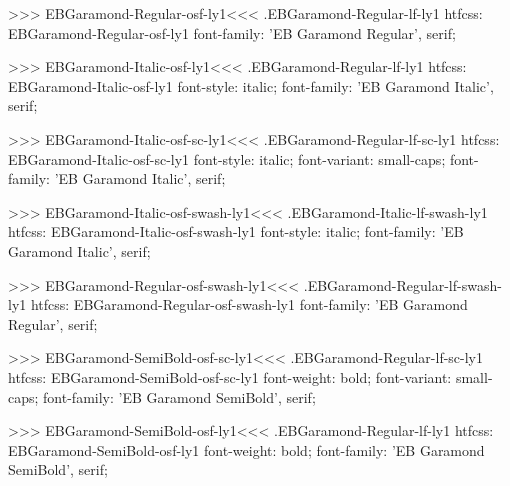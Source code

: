 {{>>>
\<EBGaramond-Regular-osf-ly1\><<<
.EBGaramond-Regular-lf-ly1
htfcss:  EBGaramond-Regular-osf-ly1  font-family: 'EB Garamond Regular', serif;

>>>
\<EBGaramond-Italic-osf-ly1\><<<
.EBGaramond-Regular-lf-ly1
htfcss:  EBGaramond-Italic-osf-ly1  font-style: italic; font-family: 'EB Garamond Italic', serif;

>>>
\<EBGaramond-Italic-osf-sc-ly1\><<<
.EBGaramond-Regular-lf-sc-ly1
htfcss:  EBGaramond-Italic-osf-sc-ly1  font-style: italic; font-variant: small-caps; font-family: 'EB Garamond Italic', serif;

>>>
\<EBGaramond-Italic-osf-swash-ly1\><<<
.EBGaramond-Italic-lf-swash-ly1
htfcss:  EBGaramond-Italic-osf-swash-ly1  font-style: italic; font-family: 'EB Garamond Italic', serif;

>>>
\<EBGaramond-Regular-osf-swash-ly1\><<<
.EBGaramond-Regular-lf-swash-ly1
htfcss:  EBGaramond-Regular-osf-swash-ly1  font-family: 'EB Garamond Regular', serif;

>>>
\<EBGaramond-SemiBold-osf-sc-ly1\><<<
.EBGaramond-Regular-lf-sc-ly1
htfcss:  EBGaramond-SemiBold-osf-sc-ly1  font-weight: bold; font-variant: small-caps; font-family: 'EB Garamond SemiBold', serif;

>>>
\<EBGaramond-SemiBold-osf-ly1\><<<
.EBGaramond-Regular-lf-ly1
htfcss:  EBGaramond-SemiBold-osf-ly1  font-weight: bold; font-family: 'EB Garamond SemiBold', serif;

}}
